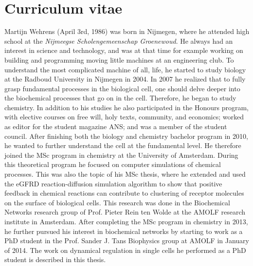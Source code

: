 


\chapter*{Curriculum vitae}

Martijn Wehrens (April 3rd, 1986) was born in Nijmegen, where he attended high school 
at the \textit{Nijmeegse Scholengemeenschap Groenewoud}.
%
He always had an interest in science and technology, 
and was at that time for example working on building and programming moving little machines at an engineering club.
%
To understand the most complicated machine of all, life, he started to study biology at the Radboud University in Nijmegen in 2004.
%
In 2007 he realized that to fully grasp fundamental processes in the biological cell, 
one should delve deeper into the biochemical processes that go on in the cell.
%
Therefore, he began to 
study chemistry. 
%
In addition to his studies he also participated in the Honours program, with elective courses on free will, holy texts, community, and economics; 
worked as editor for the student magazine ANS; and was a member of the student council.
%
After finishing both the biology and chemistry bachelor program in 2010, he wanted to further understand the cell at the fundamental level.
%
He therefore joined the MSc program in chemistry at the University of Amsterdam.
%
During this theoretical program he focused on computer simulations of chemical processes.
%
This was also the topic of his MSc thesis, where he extended and used the eGFRD reaction-diffusion simulation algorithm to show that 
positive feedback in chemical reactions can contribute to clustering of receptor molecules on the surface of biological cells. 
%
This research was done in the Biochemical Networks research group of Prof. Pieter Rein ten Wolde at the AMOLF research institute in Amsterdam.
%
After completing the MSc program in chemistry in 2013, he further pursued his interest in biochemical networks 
by starting to work as a PhD student in the Prof. Sander J. Tans Biophysics group at AMOLF in January of 2014. 
%
The work on dynamical regulation in single cells he performed as a PhD student is described in this thesis.




